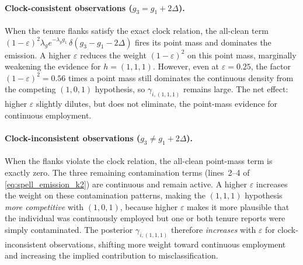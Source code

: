 \paragraph{Clock-consistent observations (\(g_3 = g_1 + 2\Delta\)).}
When the tenure flanks satisfy the exact clock relation, the all-clean
term \((1-\varepsilon)^2 \lambda_g e^{-\lambda_g g_1}\, \delta(g_3 - g_1 - 2\Delta)\)
fires its point mass and dominates the emission. A higher \(\varepsilon\)
reduces the weight \((1-\varepsilon)^2\) on this point mass, marginally
weakening the evidence for \(h = (1,1,1)\). However, even at
\(\varepsilon = 0.25\), the factor \((1-\varepsilon)^2 = 0.56\) times a
point mass still dominates the continuous density from the competing
\((1,0,1)\) hypothesis, so \(\gamma_{i,(1,1,1)}\) remains large. The
net effect: higher \(\varepsilon\) slightly dilutes, but does not
eliminate, the point-mass evidence for continuous employment.

\paragraph{Clock-inconsistent observations (\(g_3 \neq g_1 + 2\Delta\)).}
When the flanks violate the clock relation, the all-clean point-mass
term is exactly zero. The three remaining contamination terms
(lines~2--4 of \eqref{eq:spell_emission_k2}) are continuous and remain
active. A higher \(\varepsilon\) increases the weight on these
contamination patterns, making the \((1,1,1)\) hypothesis
\emph{more competitive} with \((1,0,1)\), because higher \(\varepsilon\)
makes it more plausible that the individual was continuously employed
but one or both tenure reports were simply contaminated. The posterior
\(\gamma_{i,(1,1,1)}\) therefore \emph{increases} with \(\varepsilon\)
for clock-inconsistent observations, shifting more weight toward
continuous employment and increasing the implied contribution to
misclassification.

